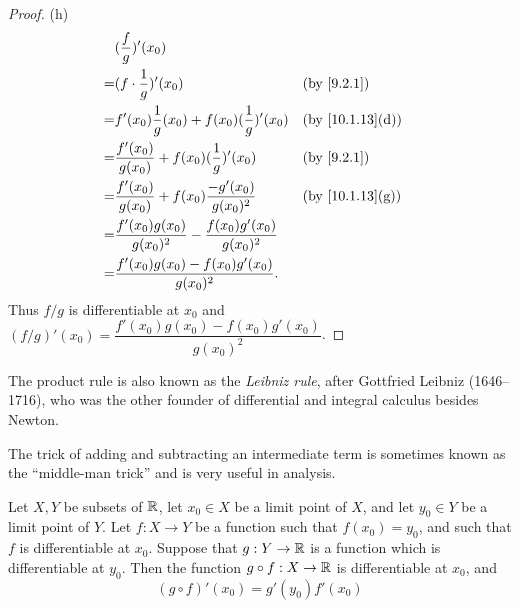 \begin{proof}{(h)}
  \begin{align*}
      & (\dfrac{f}{g})'(x_0)                                                                                   \\
    = & (f \cdot \dfrac{1}{g})'(x_0)                                        &  & \by{9.2.1}                    \\
    = & f'(x_0) \dfrac{1}{g}(x_0) + f(x_0) (\dfrac{1}{g})'(x_0)             &  & \text{(by \cref{10.1.13}(d))} \\
    = & \dfrac{f'(x_0)}{g(x_0)} + f(x_0) (\dfrac{1}{g})'(x_0)               &  & \by{9.2.1}                    \\
    = & \dfrac{f'(x_0)}{g(x_0)} + f(x_0) \dfrac{-g'(x_0)}{g(x_0)^2}         &  & \text{(by \cref{10.1.13}(g))} \\
    = & \dfrac{f'(x_0) g(x_0)}{g(x_0)^2} - \dfrac{f(x_0) g'(x_0)}{g(x_0)^2}                                    \\
    = & \dfrac{f'(x_0) g(x_0) - f(x_0) g'(x_0)}{g(x_0)^2}.                                                     \\
  \end{align*}
  Thus \(f / g\) is differentiable at \(x_0\) and \((f / g)'(x_0) = \dfrac{f'(x_0) g(x_0) - f(x_0) g'(x_0)}{g(x_0)^2}\).
\end{proof}

\begin{rmk}\label{10.1.14}
  The product rule is also known as the \emph{Leibniz rule}, after Gottfried Leibniz (1646--1716), who was the other founder of differential and integral calculus besides Newton.
\end{rmk}

\begin{note}
  The trick of adding and subtracting an intermediate term is sometimes known as the ``middle-man trick'' and is very useful in analysis.
\end{note}

\begin{thm}\label{10.1.15}
  Let \(X, Y\) be subsets of \(\mathbb{R}\), let \(x_0 \in X\) be a limit point of \(X\), and let \(y_0 \in Y\) be a limit point of \(Y\).
  Let \(f : X \to Y\) be a function such that \(f(x_0) = y_0\), and such that \(f\) is differentiable at \(x_0\).
  Suppose that \(g : Y \to \mathbb{R}\) is a function which is differentiable at \(y_0\).
  Then the function \(g \circ f : X \to \mathbb{R}\) is differentiable at \(x_0\), and
  \[
    (g \circ f)'(x_0) = g'(y_0) f'(x_0)
  \]
\end{thm}

